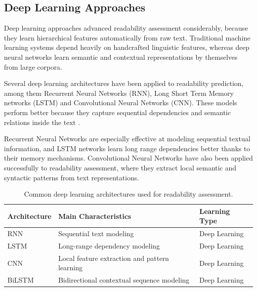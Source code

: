 \subsection{Deep Learning Approaches}

Deep learning approaches advanced readability assessment considerably, because they learn hierarchical features automatically from raw text. Traditional machine learning systems depend heavily on handcrafted linguistic features, whereas deep neural networks learn semantic and contextual representations by themselves from large corpora.

Several deep learning architectures have been applied to readability prediction, among them Recurrent Neural Networks (RNN), Long Short Term Memory networks (LSTM) and Convolutional Neural Networks (CNN). These models perform better because they capture sequential dependencies and semantic relations inside the text \cite{martinc2021supervised}.

Recurrent Neural Networks are especially effective at modeling sequential textual information, and LSTM networks learn long range dependencies better thanks to their memory mechanisms. Convolutional Neural Networks have also been applied successfully to readability assessment, where they extract local semantic and syntactic patterns from text representations.

\begin{table}[H]

\centering

\caption{Common deep learning architectures used for readability assessment.}

\label{tab:deep_learning_readability}

\begin{tabular}{p{4cm} p{7cm} p{2.5cm}}

\toprule

\textbf{Architecture} & \textbf{Main Characteristics} & \textbf{Learning Type} \\

\midrule

RNN & Sequential text modeling & Deep Learning \\

LSTM & Long-range dependency modeling & Deep Learning \\

CNN & Local feature extraction and pattern learning & Deep Learning \\

BiLSTM & Bidirectional contextual sequence modeling & Deep Learning \\

\bottomrule

\end{tabular}

\end{table}

